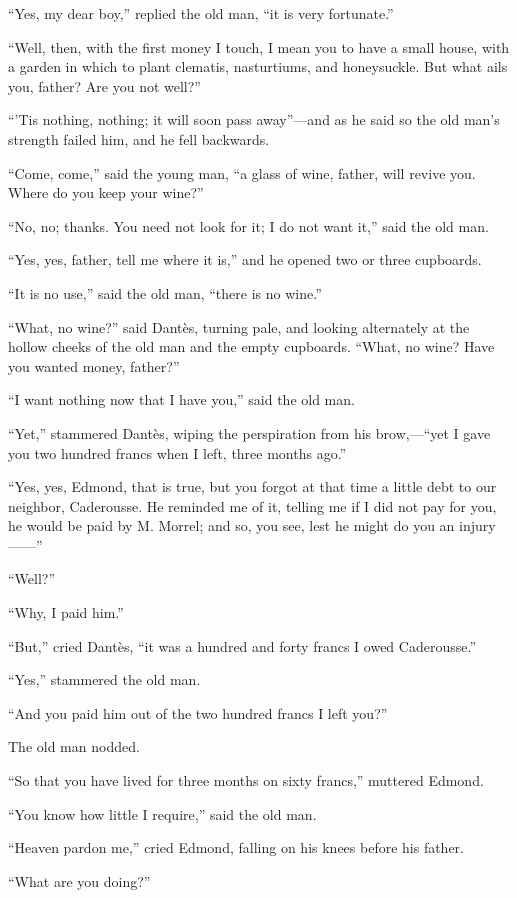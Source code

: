 “Yes, my dear boy,” replied the old man, “it is very fortunate.”

“Well, then, with the first money I touch, I mean you to have a small
house, with a garden in which to plant clematis, nasturtiums, and
honeysuckle. But what ails you, father? Are you not well?”

“’Tis nothing, nothing; it will soon pass away”—and as he said so the
old man’s strength failed him, and he fell backwards.

“Come, come,” said the young man, “a glass of wine, father, will revive
you. Where do you keep your wine?”

“No, no; thanks. You need not look for it; I do not want it,” said the
old man.

“Yes, yes, father, tell me where it is,” and he opened two or three
cupboards.

“It is no use,” said the old man, “there is no wine.”

“What, no wine?” said Dantès, turning pale, and looking alternately at
the hollow cheeks of the old man and the empty cupboards. “What, no
wine? Have you wanted money, father?”

“I want nothing now that I have you,” said the old man.

“Yet,” stammered Dantès, wiping the perspiration from his brow,—“yet I
gave you two hundred francs when I left, three months ago.”

“Yes, yes, Edmond, that is true, but you forgot at that time a little
debt to our neighbor, Caderousse. He reminded me of it, telling me if I
did not pay for you, he would be paid by M. Morrel; and so, you see,
lest he might do you an injury——”

“Well?”

“Why, I paid him.”

“But,” cried Dantès, “it was a hundred and forty francs I owed
Caderousse.”

“Yes,” stammered the old man.

“And you paid him out of the two hundred francs I left you?”

The old man nodded.

“So that you have lived for three months on sixty francs,” muttered
Edmond.

“You know how little I require,” said the old man.

“Heaven pardon me,” cried Edmond, falling on his knees before his
father.

“What are you doing?”

